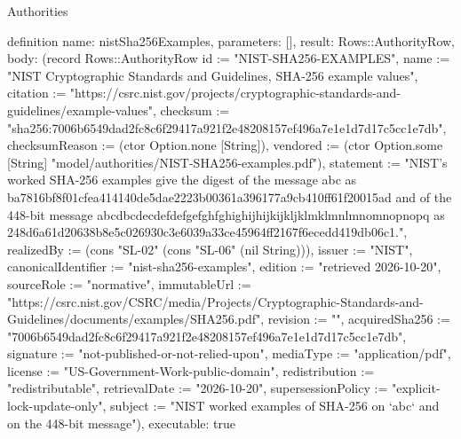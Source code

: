 \begin{lexlean}{Authorities}
\begin{semanticmodule}
definition{
  name: nistSha256Examples,
  parameters: [],
  result: Rows::AuthorityRow,
  body: (record Rows::AuthorityRow {id := "NIST-SHA256-EXAMPLES", name := "NIST Cryptographic Standards and Guidelines, SHA-256 example values", citation := "https://csrc.nist.gov/projects/cryptographic-standards-and-guidelines/example-values", checksum := "sha256:7006b6549dad2fc8c6f29417a921f2e48208157ef496a7e1e1d7d17c5cc1e7db", checksumReason := (ctor Option.none [String]), vendored := (ctor Option.some [String] "model/authorities/NIST-SHA256-examples.pdf"), statement := "NIST's worked SHA-256 examples give the digest of the message abc as ba7816bf8f01cfea414140de5dae2223b00361a396177a9cb410ff61f20015ad and of the 448-bit message abcdbcdecdefdefgefghfghighijhijkijkljklmklmnlmnomnopnopq as 248d6a61d20638b8e5c026930c3e6039a33ce45964ff2167f6ecedd419db06c1.", realizedBy := (cons "SL-02" (cons "SL-06" (nil String))), issuer := "NIST", canonicalIdentifier := "nist-sha256-examples", edition := "retrieved 2026-10-20", sourceRole := "normative", immutableUrl := "https://csrc.nist.gov/CSRC/media/Projects/Cryptographic-Standards-and-Guidelines/documents/examples/SHA256.pdf", revision := "", acquiredSha256 := "7006b6549dad2fc8c6f29417a921f2e48208157ef496a7e1e1d7d17c5cc1e7db", signature := "not-published-or-not-relied-upon", mediaType := "application/pdf", license := "US-Government-Work-public-domain", redistribution := "redistributable", retrievalDate := "2026-10-20", supersessionPolicy := "explicit-lock-update-only", subject := "NIST worked examples of SHA-256 on `abc` and on the 448-bit message"}),
  executable: true
}


\end{semanticmodule}
\end{lexlean}
